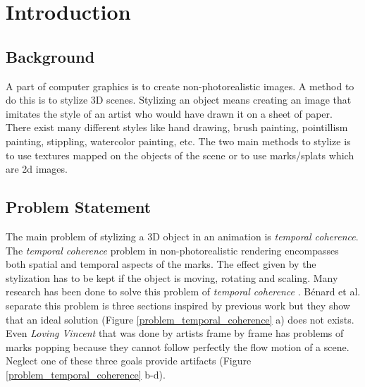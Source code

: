 \chapter{Introduction}


\section{Background}
A part of computer graphics is to create non-photorealistic images. A method to do this is to stylize 3D scenes. Stylizing an object means creating an image that imitates the style of an artist who would have drawn it on a sheet of paper. There exist many different styles like hand drawing, brush painting, pointillism painting, stippling, watercolor painting, etc. The two main methods to stylize is to use textures mapped on the objects of the scene or to use marks/splats which are 2d images.

\section{Problem Statement}


The main problem of stylizing a 3D object in an animation is \textit{temporal coherence}. The \textit{temporal coherence} problem in non-photorealistic rendering encompasses both spatial and temporal aspects of the marks. The effect given by the stylization has to be kept if the object is moving, rotating and scaling. Many research has been done to solve this problem of \textit{temporal coherence} \cite{vergne_implicit_2011, benard_dynamic_2009, bleron_motion-coherent_2018}. Bénard et al. separate this problem is three sections inspired by previous work\cite{meier_painterly_1996, cunzi_dynamic_nodate, breslav_dynamic_nodate, benard_state---art_2011} but they show that an ideal solution (Figure \ref{problem_temporal_coherence} a)  does not exists. Even \textit{Loving Vincent} \cite{LovingVincent} that was done by artists frame by frame has problems of marks popping because they cannot follow perfectly the flow motion of a scene. Neglect one of these three goals provide artifacts (Figure \ref{problem_temporal_coherence} b-d).

